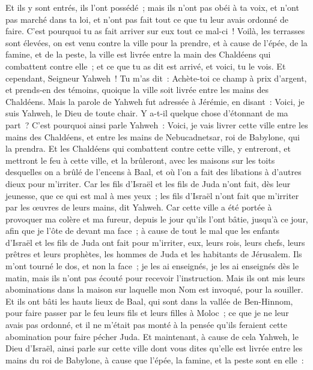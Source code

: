 \begin{multicols}{2}
Et ils y sont entrés, ils l'ont possédé~; mais ils n'ont pas obéi à ta voix, et n'ont pas marché dans ta loi, et n'ont pas fait tout ce que tu leur avais ordonné de faire. C'est pourquoi tu as fait arriver sur eux tout ce mal-ci~!
Voilà, les terrasses sont élevées, on est venu contre la ville pour la prendre, et à cause de l'épée, de la famine, et de la peste, la ville est livrée entre la main des Chaldéens qui combattent contre elle~; et ce que tu as dit est arrivé, et voici, tu le vois.
Et cependant, Seigneur Yahweh~! Tu m'as dit~: Achète-toi ce champ à prix d'argent, et prends-en des témoins, quoique la ville soit livrée entre les mains des Chaldéens.
Mais la parole de Yahweh fut adressée à Jérémie, en disant~:
Voici, je suis Yahweh, le Dieu de toute chair. Y a-t-il quelque chose d'étonnant de ma part~?
C'est pourquoi ainsi parle Yahweh~: Voici, je vais livrer cette ville entre les mains des Chaldéens, et entre les mains de Nebucadnetsar, roi de Babylone, qui la prendra.
Et les Chaldéens qui combattent contre cette ville, y entreront, et mettront le feu à cette ville, et la brûleront, avec les maisons sur les toits desquelles on a brûlé de l'encens à Baal, et où l'on a fait des libations à d'autres dieux pour m'irriter.
Car les fils d'Israël et les fils de Juda n'ont fait, dès leur jeunesse, que ce qui est mal à mes yeux~; les fils d'Israël n'ont fait que m'irriter par les œuvres de leurs mains, dit Yahweh.
Car cette ville a été portée à provoquer ma colère et ma fureur, depuis le jour qu'ils l'ont bâtie, jusqu'à ce jour, afin que je l'ôte de devant ma face~;
à cause de tout le mal que les enfants d'Israël et les fils de Juda ont fait pour m'irriter, eux, leurs rois, leurs chefs, leurs prêtres et leurs prophètes, les hommes de Juda et les habitants de Jérusalem.
Ils m'ont tourné le dos, et non la face~; je les ai enseignés, je les ai enseignés dès le matin, mais ils n'ont pas écouté pour recevoir l'instruction.
Mais ils ont mis leurs abominations dans la maison sur laquelle mon Nom est invoqué, pour la souiller.
Et ils ont bâti les hauts lieux de Baal, qui sont dans la vallée de Ben-Hinnom, pour faire passer par le feu leurs fils et leurs filles à Moloc~; ce que je ne leur avais pas ordonné, et il ne m'était pas monté à la pensée qu'ils feraient cette abomination pour faire pécher Juda.
Et maintenant, à cause de cela Yahweh, le Dieu d'Israël, ainsi parle sur cette ville dont vous dites qu'elle est livrée entre les mains du roi de Babylone, à cause que l'épée, la famine, et la peste sont en elle~:

\end{multicols}
